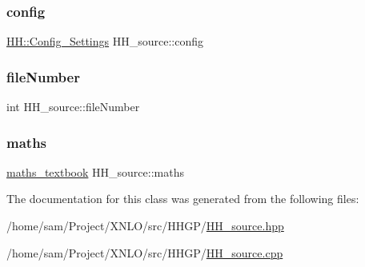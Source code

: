 \subsubsection{\texorpdfstring{config}{config}}
{\footnotesize\ttfamily \mbox{\hyperlink{class_h_h_1_1_config___settings}{H\+H\+::\+Config\+\_\+\+Settings}} H\+H\+\_\+source\+::config\hspace{0.3cm}{\ttfamily [private]}}

\mbox{\label{class_h_h__source_a6631481cc1bea05ab564cb1841644a12}} 
\subsubsection{\texorpdfstring{fileNumber}{fileNumber}}
{\footnotesize\ttfamily int H\+H\+\_\+source\+::file\+Number\hspace{0.3cm}{\ttfamily [private]}}

\mbox{\label{class_h_h__source_a93637ad30af846dd04eb741437114f8f}} 
\subsubsection{\texorpdfstring{maths}{maths}}
{\footnotesize\ttfamily \mbox{\hyperlink{classmaths__textbook}{maths\+\_\+textbook}} H\+H\+\_\+source\+::maths\hspace{0.3cm}{\ttfamily [private]}}



The documentation for this class was generated from the following files\+:\begin{DoxyCompactItemize}
\item 
/home/sam/\+Project/\+X\+N\+L\+O/src/\+H\+H\+G\+P/\mbox{\hyperlink{_h_h__source_8hpp}{H\+H\+\_\+source.\+hpp}}\item 
/home/sam/\+Project/\+X\+N\+L\+O/src/\+H\+H\+G\+P/\mbox{\hyperlink{_h_h__source_8cpp}{H\+H\+\_\+source.\+cpp}}\end{DoxyCompactItemize}
